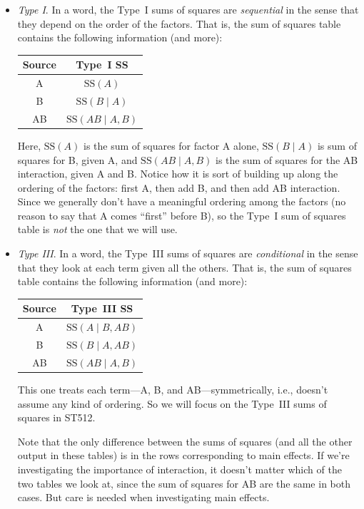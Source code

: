 \documentclass[a4paper, 12pt]{article}
\theoremstyle{plain}
\theoremstyle{definition}
\theoremstyle{remark}
\begin{document}
\begin{itemize}

\item {\em Type I}. In a word, the Type~I sums of squares are {\em sequential} in the sense that they depend on the order of the factors.  That is, the sum of squares table contains the following information (and more):
\begin{center}
\begin{tabular}{cc}
\hline
Source & Type~I SS \\
\hline
A & $\text{SS}(A)$ \\
B & $\text{SS}(B \mid A)$ \\
AB & $\text{SS}(AB \mid A, B)$ \\
\hline
\end{tabular}
\end{center}
Here, $\text{SS}(A)$ is the sum of squares for factor A alone, $\text{SS}(B \mid A)$ is sum of squares for B, given A, and $\text{SS}(AB \mid A, B)$ is the sum of squares for the AB interaction, given A and B.  Notice how it is sort of building up along the ordering of the factors: first A, then add B, and then add AB interaction.  Since we generally don't have a meaningful ordering among the factors (no reason to say that A comes ``first'' before B), so the Type~I sum of squares table is {\em not} the one that we will use.  

\item {\em Type III}. In a word, the Type~III sums of squares are {\em conditional} in the sense that they look at each term given all the others.  That is, the sum of squares table contains the following information (and more):
\begin{center}
\begin{tabular}{cc}
\hline
Source & Type~III SS \\
\hline
A & $\text{SS}(A \mid B, AB)$ \\
B & $\text{SS}(B \mid A, AB)$ \\
AB & $\text{SS}(AB \mid A, B)$ \\
\hline
\end{tabular}
\end{center} 
This one treats each term---A, B, and AB---symmetrically, i.e., doesn't assume any kind of ordering.  So we will focus on the Type~III sums of squares in ST512.  

Note that the only difference between the sums of squares (and all the other output in these tables) is in the rows corresponding to main effects.  If we're investigating the importance of interaction, it doesn't matter which of the two tables we look at, since the sum of squares for AB are the same in both cases.  But care is needed when investigating main effects.  

\end{itemize}
\end{document}
